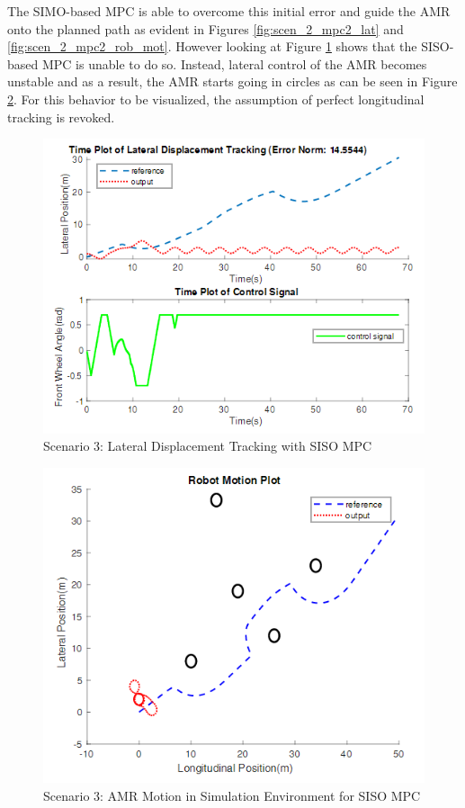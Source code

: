 \documentclass[a4paper, twocolumn]{article}
\begin{document}
The SIMO-based MPC is able to overcome this initial error and guide the AMR onto the planned path as evident in Figures \ref{fig:scen_2_mpc2_lat} and \ref{fig:scen_2_mpc2_rob_mot}. 
However looking at Figure \ref{fig:scen_2_mpc1_lat_25} shows that the SISO-based MPC is unable to do so. 
Instead, lateral control of the AMR becomes unstable and as a result, the AMR starts going in circles as can be seen in Figure \ref{fig:scen_2_mpc1_rob_mot_25}. 
For this behavior to be visualized, the assumption of perfect longitudinal tracking is revoked. 

\begin{figure}
    \centering
    \includegraphics[scale=0.40]{img/scenario_3/mpc1_25-lat_tracking.png}
    \caption{Scenario 3: Lateral Displacement Tracking with SISO MPC}
    \label{fig:scen_2_mpc1_lat_25}
\end{figure}

\begin{figure}
    \centering
    \includegraphics[scale=0.40]{img/scenario_3/mpc1_25-robot_motion.png}
    \caption{Scenario 3: AMR Motion in Simulation Environment for SISO MPC}
    \label{fig:scen_2_mpc1_rob_mot_25}
\end{figure}
\end{document}
